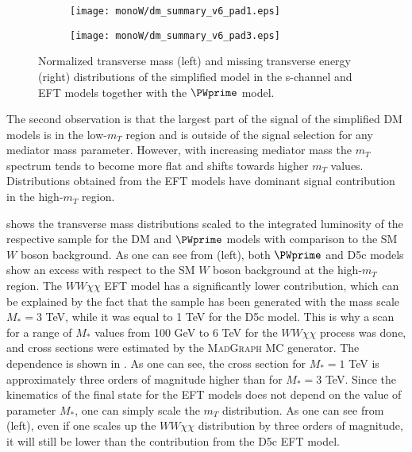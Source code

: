 \begin{figure}[]
\begin{subfigure}{.5\textwidth}
  \centering
  \texttt{[image: monoW/dm\_summary\_v6\_pad1.eps]}
\end{subfigure}%
\begin{subfigure}{.5\textwidth}
  \centering
  \texttt{[image: monoW/dm\_summary\_v6\_pad3.eps]}
\end{subfigure}
\caption{Normalized transverse mass (left) and missing transverse energy (right) distributions of the simplified model in the s-channel and EFT models together with the $\PWprime$ model.}
  \label{fig:kinematicsSChannel}
\end{figure}

The second observation is that the largest part of the signal of the simplified DM models 
is in the low-$m_{T}$ region and is outside of the signal selection for any mediator mass parameter.
However, with increasing mediator mass the $m_{T}$ spectrum tends to become 
more flat and shifts towards higher $m_{T}$ values.
Distributions obtained from the EFT models have dominant signal contribution in the high-$m_T$ region.

 shows the transverse mass distributions
scaled to the integrated luminosity of the respective sample for the DM and $\PWprime$ models with comparison to the SM $W$ boson background.
As one can see from  (left), both $\PWprime$ and 
D5c models show an excess with respect to the SM $W$ boson background at the high-$m_T$ region. The $WW\chi\chi$ EFT model has a significantly lower contribution, which can be explained by the fact that the sample has been generated with the mass scale $M_{*} = 3$ TeV, while it was equal to 1 TeV for the D5c model. 
This is why a scan for a range of $M_{*}$ values from 100 GeV to 6 TeV for the $WW\chi\chi$ process was done, and cross sections were estimated by the M{\scshape ad}G{\scshape raph} MC generator.
The dependence is shown in .
As one can see, the cross section for $M_{*} = 1$ TeV is approximately three orders of magnitude higher than for $M_{*} = 3$ TeV.
Since the kinematics of the final state for the EFT models does not depend on the value of parameter $M_{*}$, one can simply scale the $m_T$ distribution.
As one can see from  (left), even if one scales up the $WW\chi\chi$ distribution by three orders of magnitude, it will still be lower than the contribution from the D5c EFT model.

